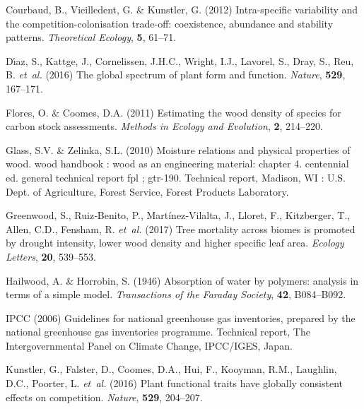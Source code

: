 \documentclass[a4paper, 12pt, leqno, dvipsnames]{article}\usepackage[]{graphicx}\usepackage[]{color}
\begin{document}
\begin{thebibliography}{50}
Courbaud, B., Vieilledent, G. \& Kunstler, G. (2012) Intra-specific variability
  and the competition-colonisation trade-off: coexistence, abundance and
  stability patterns.
\newblock \emph{Theoretical Ecology}, \textbf{5}, 61--71.

D{\'{\i}}az, S., Kattge, J., Cornelissen, J.H.C., Wright, I.J., Lavorel, S.,
  Dray, S., Reu, B. \emph{et~al.} (2016) The global spectrum of plant form
  and function.
\newblock \emph{Nature}, \textbf{529}, 167--171.

Flores, O. \& Coomes, D.A. (2011) Estimating the wood density of species for
  carbon stock assessments.
\newblock \emph{Methods in Ecology and Evolution}, \textbf{2}, 214--220.

Glass, S.V. \& Zelinka, S.L. (2010) Moisture relations and physical properties
  of wood. wood handbook : wood as an engineering material: chapter 4.
  centennial ed. general technical report fpl ; gtr-190.
\newblock Technical report, Madison, WI : U.S. Dept. of Agriculture, Forest
  Service, Forest Products Laboratory.

Greenwood, S., Ruiz‐Benito, P., Martínez‐Vilalta, J., Lloret, F.,
  Kitzberger, T., Allen, C.D., Fensham, R. \emph{et~al.} (2017) Tree mortality across biomes
  is promoted by drought intensity, lower wood density and higher specific leaf
  area.
\newblock \emph{Ecology Letters}, \textbf{20}, 539--553.

Hailwood, A. \& Horrobin, S. (1946) Absorption of water by polymers: analysis
  in terms of a simple model.
\newblock \emph{Transactions of the Faraday Society}, \textbf{42}, B084--B092.

IPCC (2006) Guidelines for national greenhouse gas inventories, prepared by the
  national greenhouse gas inventories programme.
\newblock Technical report, The Intergovernmental Panel on Climate Change,
  IPCC/IGES, Japan.

Kunstler, G., Falster, D., Coomes, D.A., Hui, F., Kooyman, R.M., Laughlin,
  D.C., Poorter, L. \emph{et~al.} (2016) Plant functional traits have globally consistent effects
  on competition.
\newblock \emph{Nature}, \textbf{529}, 204--207.


\end{thebibliography}
\end{document}
